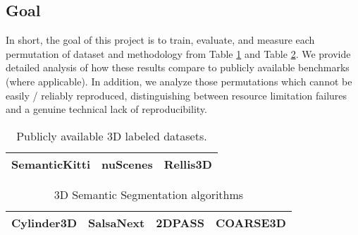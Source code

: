\subsection{Goal}
\label{sec:goal}

In short, the goal of this project is to train, evaluate, and measure each permutation of dataset and methodology from Table \ref{tab:datasets} and Table \ref{tab:segmenters}. We provide detailed analysis of how these results compare to publicly available benchmarks (where applicable). In addition, we analyze those permutations which cannot be easily / reliably reproduced, distinguishing between resource limitation failures and a genuine technical lack of reproducibility.

\begin{table}[h!]
\begin{center}
\begin{tabular}{ |c|c|c| }
 \hline
  SemanticKitti \cite{semantickitti1,semantickitti2} & nuScenes \cite {nuscenes} & Rellis3D \cite{rellis3d} \\
 \hline
\end{tabular}
\caption{Publicly available 3D labeled datasets.}
\label{tab:datasets}
\end{center}
\end{table}

\begin{table}[h!]
\begin{center}
\begin{tabular}{ |c|c|c|c| }
 \hline
  Cylinder3D \cite{cylinder3d} & SalsaNext \cite{salsanext} & 2DPASS \cite{2dpass} & COARSE3D \cite{coarse3d} \\
 \hline
\end{tabular}
\end{center}
\caption{3D Semantic Segmentation algorithms}
\label{tab:segmenters}
\end{table}
